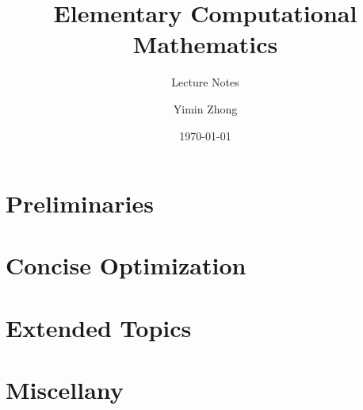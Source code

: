 \documentclass[12pt,letterpaper,final]{book}
\title{Elementary Computational Mathematics}
\subtitle{Lecture Notes}
\author{Yimin Zhong}
\date{\today}
\begin{document}
\maketitle
\frontmatter
\tableofcontents
\mainmatter
\part{Preliminaries}









\part{Concise Optimization}
\part{Extended Topics}

\part{Miscellany}
\end{document}
